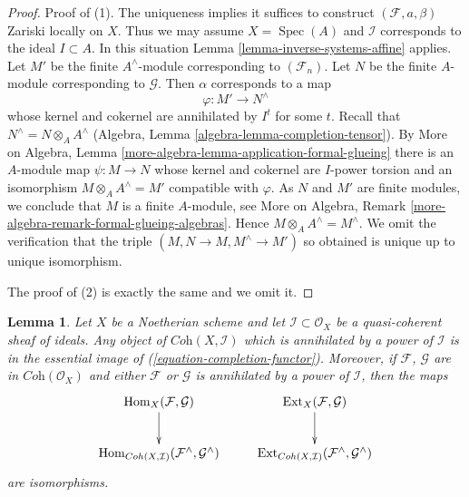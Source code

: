 \documentclass{stacks-project}
\theoremstyle{plain}
\newtheorem{lemma}[subsection]{Lemma}
\theoremstyle{definition}
\theoremstyle{remark}
\numberwithin{equation}{subsection}
\def\Spec{\mathop{\mathrm{Spec}}}
\def\Hom{\mathop{\mathrm{Hom}}\nolimits}
\def\Ext{\mathop{\mathrm{Ext}}\nolimits}
\begin{document}
\begin{proof}
Proof of (1). The uniqueness implies it suffices to construct
$(\mathcal{F}, a, \beta)$
Zariski locally on $X$. Thus we may assume $X = \Spec(A)$ and $\mathcal{I}$
corresponds to the ideal $I \subset A$. In this situation
Lemma \ref{lemma-inverse-systems-affine} applies.
Let $M'$ be the finite $A^\wedge$-module corresponding
to $(\mathcal{F}_n)$. Let $N$ be the finite $A$-module corresponding to
$\mathcal{G}$. Then $\alpha$ corresponds to a map
$$
\varphi : M' \longrightarrow N^\wedge
$$
whose kernel and cokernel are annihilated by $I^t$ for some $t$. Recall that
$N^\wedge = N \otimes_A A^\wedge$
(Algebra, Lemma \ref{algebra-lemma-completion-tensor}).
By More on Algebra, Lemma \ref{more-algebra-lemma-application-formal-glueing}
there is an $A$-module map $\psi : M \to N$ whose kernel and cokernel are
$I$-power torsion and an isomorphism
$M \otimes_A A^\wedge = M'$ compatible with $\varphi$.
As $N$ and $M'$ are finite modules, we conclude that $M$
is a finite $A$-module, see
More on Algebra, Remark \ref{more-algebra-remark-formal-glueing-algebras}.
Hence $M \otimes_A A^\wedge = M^\wedge$. We omit the verification
that the triple $(M, N \to M, M^\wedge \to M')$ so obtained
is unique up to unique isomorphism.

\medskip\noindent
The proof of (2) is exactly the same and we omit it.
\end{proof}

\begin{lemma}
\label{lemma-torsion-hom-ext}
Let $X$ be a Noetherian scheme and let $\mathcal{I} \subset \mathcal{O}_X$
be a quasi-coherent sheaf of ideals. Any object of
$\textit{Coh}(X, \mathcal{I})$ which is annihilated
by a power of $\mathcal{I}$ is in the essential image of
(\ref{equation-completion-functor}).
Moreover, if $\mathcal{F}$, $\mathcal{G}$ are in $\textit{Coh}(\mathcal{O}_X)$
and either $\mathcal{F}$ or $\mathcal{G}$ is annihilated by a power of
$\mathcal{I}$, then the maps
$$
\xymatrix{
\Hom_X(\mathcal{F}, \mathcal{G}) \ar[d] &
\Ext_X(\mathcal{F}, \mathcal{G}) \ar[d] \\
\Hom_{\textit{Coh}(X, \mathcal{I})}(\mathcal{F}^\wedge, \mathcal{G}^\wedge) &
\Ext_{\textit{Coh}(X, \mathcal{I})}(\mathcal{F}^\wedge, \mathcal{G}^\wedge)
}
$$
are isomorphisms.
\end{lemma}
\end{document}
